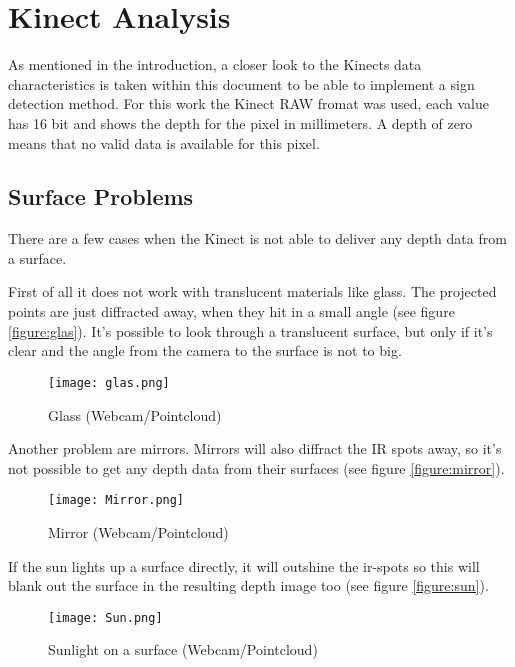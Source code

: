 \chapter{Kinect Analysis}
\graphicspath{{./KinectData/img/}}

As mentioned in the introduction, a closer look to the Kinects data characteristics is taken
within this document to be able to implement a sign detection method. 
For this work the Kinect RAW fromat was used, each value has 16 bit and shows the
depth for the pixel in millimeters. A depth of zero means that no valid data is available for
this pixel.

\section{Surface Problems}

There are a few cases when the Kinect is not able to deliver any depth data from a surface.

First of all it does not work with translucent materials like glass. The projected
points are just diffracted away, when they hit in a small angle (see figure \vref{figure:glas}). 
It's possible to look through a translucent surface, but only if it's clear and the angle from the 
camera to the surface is not to big.
\begin{figure}[htp]
\begin{center}
  \texttt{[image: glas.png]} 
  \caption{Glass (Webcam/Pointcloud)}
  \label{figure:glas}
\end{center}
\end{figure}
 
Another problem are mirrors. Mirrors will also diffract the IR spots away, 
so it's not possible to get any depth data from their surfaces (see figure \vref{figure:mirror}).
\begin{figure}[htp]
\begin{center}
  \texttt{[image: Mirror.png]}
  \caption{Mirror (Webcam/Pointcloud)}
  \label{figure:mirror}
\end{center}
\end{figure}

If the sun lights up a surface directly, it will outshine the ir-spots so this will blank out the surface
in the resulting depth image too (see figure \vref{figure:sun}).
\begin{figure}[htp]
\begin{center}
  \texttt{[image: Sun.png]}
  \caption{Sunlight on a surface (Webcam/Pointcloud)}
  \label{figure:sun}
\end{center}
\end{figure}

